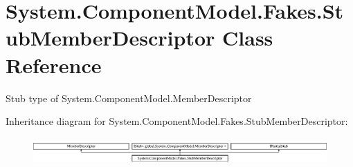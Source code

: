 \hypertarget{class_system_1_1_component_model_1_1_fakes_1_1_stub_member_descriptor}{\section{System.\-Component\-Model.\-Fakes.\-Stub\-Member\-Descriptor Class Reference}
\label{class_system_1_1_component_model_1_1_fakes_1_1_stub_member_descriptor}
}


Stub type of System.\-Component\-Model.\-Member\-Descriptor 


Inheritance diagram for System.\-Component\-Model.\-Fakes.\-Stub\-Member\-Descriptor\-:\begin{figure}[H]
\begin{center}
\leavevmode
\includegraphics[height=1.034164cm]{class_system_1_1_component_model_1_1_fakes_1_1_stub_member_descriptor}
\end{center}
\end{figure}

